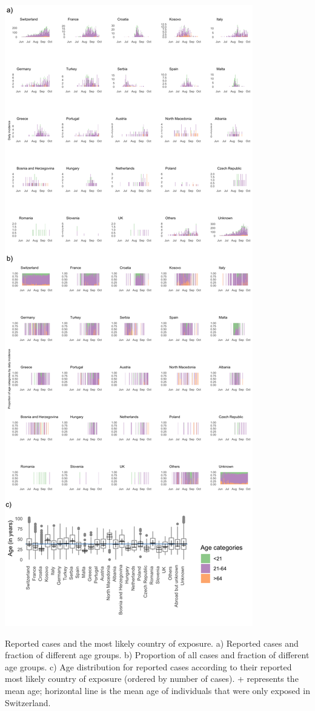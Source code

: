 \documentclass[10pt, a4paper, twoside]{article}
\begin{document}
\clearpage
\begin{suppfigure}[h]
\centering
\includegraphics[scale=0.125]{SF2_2021-06-02.png}
\caption{Reported cases and the most likely country of exposure.
a) Reported cases and fraction of different age groups.
b) Proportion of all cases and fraction of different age groups.
c) Age distribution for reported cases according to their reported most likely country of exposure (ordered by number of cases).
+ represents the mean age; horizontal line is the mean age of individuals that were only exposed in Switzerland.}
\label{sf2}
\end{suppfigure}
\end{document}
